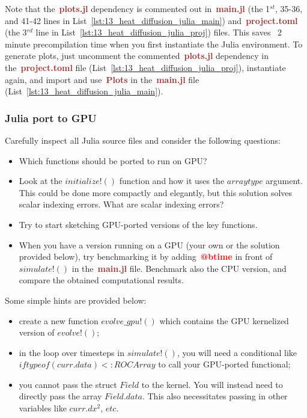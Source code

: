 


\par
Note that the~\textbf{\textcolor{brown}{plots.jl}} dependency is commented out in~\textbf{\textcolor{brown}{main.jl}} (the 1$^{st}$, 35-36, and 41-42 lines in List~\ref{lst:13_heat_diffusion_julia_main}) and~\textbf{\textcolor{brown}{project.toml}} (the 3$^{rd}$ line in List~\ref{lst:13_heat_diffusion_julia_proj}) files.
This saves ~2 minute precompilation time when you first instantiate the Julia environment.
To generate plots, just uncomment the commented~\textbf{\textcolor{brown}{plots.jl}} dependency in the~\textbf{\textcolor{brown}{project.toml}} file (List~\ref{lst:13_heat_diffusion_julia_proj}), instantiate again, and import and use~\textbf{\textcolor{brown}{Plots}} in the~\textbf{\textcolor{brown}{main.jl}} file (List~\ref{lst:13_heat_diffusion_julia_main}).


\subsubsection{Julia port to GPU}


\par
Carefully inspect all Julia source files and consider the following questions:
\begin{itemize}
    \item Which functions should be ported to run on GPU?
    \item Look at the $initialize!()$ function and how it uses the $arraytype$ argument. This could be done more compactly and elegantly, but this solution solves scalar indexing errors. What are scalar indexing errors?
    \item Try to start sketching GPU-ported versions of the key functions.
    \item When you have a version running on a GPU (your own or the solution provided below), try benchmarking it by adding~\textbf{\textcolor{red}{@btime}} in front of $simulate!()$ in the~\textbf{\textcolor{brown}{main.jl}} file. Benchmark also the CPU version, and compare the obtained computational results.
\end{itemize}


\par
Some simple hints are provided below:
\begin{itemize}
    \item create a new function $evolve\_gpu!()$ which contains the GPU kernelized version of $evolve!()$;
    \item in the loop over timesteps in $simulate!()$, you will need a conditional like $if typeof(curr.data) <: ROCArray$ to call your GPU-ported functional;
    \item you cannot pass the struct $Field$ to the kernel. You will instead need to directly pass the array $Field.data$. This also necessitates passing in other variables like $curr.dx^2$, $etc$.
\end{itemize}



